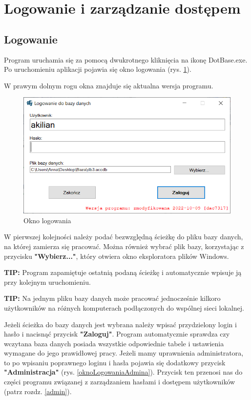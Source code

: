 
\rozdzial

\section{Logowanie i zarządzanie dostępem}

\subsection{Logowanie}

Program uruchamia się za pomocą dwukrotnego kliknięcia na ikonę DotBase.exe.
Po uruchomieniu aplikacji pojawia się okno logowania (rys. \ref{oknoLogowania}).

W prawym dolnym rogu okna znajduje się aktualna wersja programu.

\begin{figure}[htb]
	\centering
	\includegraphics{obrazki/Logowanie/logowanie.png}
	\caption{Okno logowania}
	\label{oknoLogowania}
\end{figure}

W pierwszej kolejności należy podać bezwzględną ścieżkę do pliku bazy danych, na której zamierza się pracować. Można również wybrać plik bazy, korzystając z przycisku \textbf{"Wybierz..."}, który otwiera okno eksploratora plików Windows. 

\textbf{TIP:} Program zapamiętuje ostatnią podaną ścieżkę i automatycznie wpisuje ją przy kolejnym uruchomieniu.

\textbf{TIP:} Na jednym pliku bazy danych może pracować jednocześnie kilkoro użytkowników na różnych komputerach podłączonych do wspólnej sieci lokalnej.

Jeżeli ścieżka do bazy danych jest wybrana należy wpisać przydzielony login i hasło i nacisnąć przycisk \textbf{"Zaloguj"}. Program automatycznie sprawdza czy wczytana baza danych posiada wszystkie odpowiednie tabele i ustawienia wymagane do jego prawidłowej pracy.
Jeżeli mamy uprawnienia administratora, to po wpisaniu poprawnego loginu i hasła pojawia się dodatkowy przycisk \textbf{"Administracja"} (rys. \ref{oknoLogowaniaAdmina}). Przycisk ten przenosi nas do części programu związanej z zarządzaniem hasłami i dostępem użytkowników (patrz rozdz. \ref{admin}).

